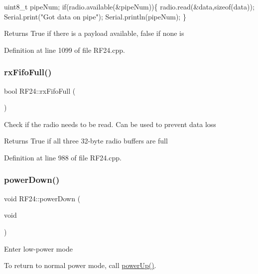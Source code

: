 \begin{DoxyCode}
uint8\_t pipeNum;
\textcolor{keywordflow}{if}(radio.available(&pipeNum))\{
  radio.read(&data,\textcolor{keyword}{sizeof}(data));
  Serial.print(\textcolor{stringliteral}{"Got data on pipe"});
  Serial.println(pipeNum);
\}
\end{DoxyCode}
 \begin{DoxyReturn}{Returns}
True if there is a payload available, false if none is 
\end{DoxyReturn}


Definition at line 1099 of file R\+F24.\+cpp.

\mbox{\label{classRF24_ad22e44fe1a68747872fcb304a407fd30}} 
\subsubsection{\texorpdfstring{rx\+Fifo\+Full()}{rxFifoFull()}}
{\footnotesize\ttfamily bool R\+F24\+::rx\+Fifo\+Full (\begin{DoxyParamCaption}{ }\end{DoxyParamCaption})}

Check if the radio needs to be read. Can be used to prevent data loss \begin{DoxyReturn}{Returns}
True if all three 32-\/byte radio buffers are full 
\end{DoxyReturn}


Definition at line 988 of file R\+F24.\+cpp.

\mbox{\label{classRF24_aa0a51923a09ba4f3478aba9be0f8a6a1}} 
\subsubsection{\texorpdfstring{power\+Down()}{powerDown()}}
{\footnotesize\ttfamily void R\+F24\+::power\+Down (\begin{DoxyParamCaption}\item[{void}]{ }\end{DoxyParamCaption})}

Enter low-\/power mode

To return to normal power mode, call \hyperlink{classRF24_a5cdaf47aa0edd6dca1b9a8bb7972a1a3}{power\+Up()}.

